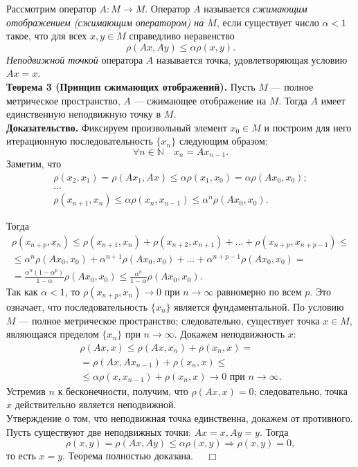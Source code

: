 \documentclass[12pt,a4paper, titlepage]{article}
\begin{document}
Рассмотрим оператор $A: M \to M$. Оператор $A$ называется \textit{сжимающим отображением (сжимающим оператором) на $M$}, если существует число $\alpha < 1$ такое, что для всех $x, y \in M$ справедливо неравенство 
$$
\rho (Ax, Ay) \leqslant \alpha \rho (x, y).
$$
\textit{Неподвижной точкой} оператора $A$ называется точка, удовлетворяющая условию $Ax = x$.\\

\textbf{Теорема 3 (Принцип сжимающих отображений).}
Пусть $M$ --- полное метрическое пространство,  $A$ --- сжимающее отображение на $M$. Тогда $A$ имеет единственную неподвижную точку в $M$.\\
\textbf{Доказательство.}
Фиксируем произвольный элемент $x_0 \in M$ и построим для него итерационную последовательность $\lbrace x_n \rbrace$ следующим образом:
$$
\forall n \in \mathbb{N} \quad x_n = Ax_{n-1}.
$$
Заметим, что
\begin{gather*}
\rho(x_2, x_1) = \rho (Ax_1, Ax) \leqslant \alpha \rho(x_1, x_0) = \alpha \rho(Ax_0, x_0);\\
\dots\\
\rho(x_{n+1}, x_n) \leqslant \alpha\rho(x_n, x_{n-1}) \leqslant \alpha^n \rho(Ax_0, x_0).
\end{gather*}

Тогда
\begin{multline*}
\rho(x_{n+p}, x_n) \leqslant \rho(x_{n+1}, x_n) + \rho (x_{n+2}, x_{n+1})+ \dots + \rho(x_{n+p}, x_{n+p-1}) \leqslant \\
\leqslant \alpha^n \rho(Ax_0, x_0) + \alpha^{n+1} \rho(Ax_0, x_0) + \dots + \alpha^{n+p-1} \rho(Ax_0,x_0) = \\
= \frac {\alpha^n (1 - \alpha^p)}{1-\alpha} \rho (Ax_0, x_0)
\leqslant \frac {\alpha^n}{1-\alpha} \rho(Ax_0,x_0).
\end{multline*}
Так как $\alpha < 1$, то $\rho(x_{n+p}, x_n) \to 0$ при $n\to\infty$ равномерно по всем $p$. Это означает, что последовательность $\lbrace x_n \rbrace$ является фундаментальной. По условию $M$ --- полное метрическое пространство; следовательно, существует точка $x \in M$, являющаяся пределом $\lbrace x_n \rbrace$ при $n\to\infty$. Докажем неподвижность $x$:
\begin{multline*}
\rho (Ax, x) \leqslant \rho(Ax, x_n) + \rho(x_n, x) = \\
= \rho(Ax, Ax_{n-1}) + \rho (x_n, x) \leqslant \\
\leqslant \alpha \rho (x, x_{n-1}) + \rho(x_n, x) \to 0 \text{ при } n\to\infty.
\end{multline*}
Устремив $n$ к бесконечности, получим, что $\rho (Ax, x) = 0$; следовательно, точка $x$ действительно является неподвижной.\\
Утверждение о том, что неподвижная точка единственна, докажем от противного. Пусть существуют две неподвижных точки: $Ax = x, Ay = y$. Тогда 
$$
\rho (x, y) = \rho(Ax, Ay) \leqslant \alpha\rho(x,y) \Rightarrow \rho(x,y) = 0,
$$
то есть $x = y$. Теорема полностью доказана. $\quad \Box$\\
\end{document}
